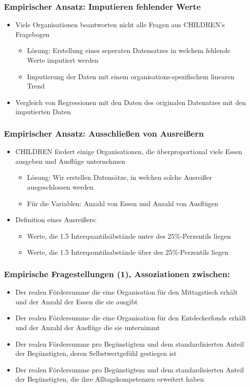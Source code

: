 \begin{frame}[fragile]
\frametitle{Empirischer Ansatz: Imputieren fehlender Werte}
\begin{itemize}
\item Viele Organisationen beantworten nicht alle Fragen aus CHILDREN's Fragebogen
\begin{itemize}
\item Lösung: Erstellung eines seperaten Datensatzes in welchem fehlende Werte imputiert werden
\item Imputierung der Daten mit einem organisations-spezifischem linearen Trend
\end{itemize}
\item Vergleich von Regressionen mit den Daten des originalen Datenatzes mit den imputierten Daten
\end{itemize}
\end{frame}


\begin{frame}[fragile]
\frametitle{Empirischer Ansatz: Ausschließen von Ausreißern}
\begin{itemize}
\item CHILDREN fördert einige Organisationen, die überproportional viele Essen ausgeben und Ausflüge unternehmen
\begin{itemize}
\item Lösung: Wir erstellen Datensätze, in welchen solche Ausreißer ausgeschlossen werden
\item Für die Variablen: Anzahl von Essen und Anzahl von Ausflügen
\end{itemize}
\item Definition eines Ausreißers:
\begin{itemize}
\item Werte, die 1.5 Interquantilsäbstände unter des 25\%-Perzentils liegen
\item Werte, die 1.5 Interqauntilsabstände über des 25\%-Perzentils liegen
\end{itemize}
\end{itemize}
\end{frame}

\begin{frame}[fragile]
\frametitle{Empirische Fragestellungen (1), Assoziationen zwischen:}
\begin{itemize}
\item Der realen Fördersumme die eine Organisation für den Mittagstisch erhält und der Anzahl der Essen die sie ausgibt
\item Der realen Fördersumme die eine Organisation für den Entdeckerfonds erhält und der Anzahl der Ausflüge die sie unternimmt
\item Der realen Fördersumme pro Begünstigtem und dem standardisierten Anteil der Begünstigten, deren Selbstwertgefühl gestiegen ist
\item Der realen Fördersumme pro Begünstigtem und dem standardisierten Anteil der Begünstigten, die ihre Alltagskompetenzen erweitert haben
\end{itemize}
\end{frame}


